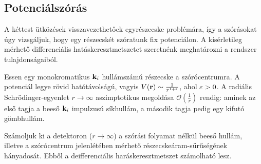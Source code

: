   \subsection{Potenciálszórás}
   
   A kéttest ütközések visszavezethetőek egyrészecske problémára, így a szórásokat úgy vizsgáljuk, hogy egy részecskét szóratunk fix potenciálon. A kísérletileg mérhető differenciális hatáskeresztmetszetet szeretnénk meghatározni a rendszer tulajdonságaiból.
   
   Essen egy monokromatikus $\mathbf{k}_i$ hullámszámú részecske a szórócentrumra. A potenciál legye rövid hatótávolságú, vagyis $V(\mathbf{r})\sim\frac{1}{r^{1+\varepsilon}}$, ahol $\varepsilon>0$. A radiális Schrödinger-egyenlet $r\to\infty$ aszimptotikus megoldása $\mathcal{O}\left(\frac{1}{r}\right)$ rendig:
   aminek az első tagja a beeső $\mathbf{k}_i$ impulzusú síkhullám, a második tagja pedig egy kifutó gömbhullám.
   
   Számoljuk ki a detektoron ($r\to\infty$) a szórási folyamat nélkül beeső hullám, illetve a szórócentrum jelenlétében mérhető részecskeáram-sűrűségének hányadosát. Ebből a deifferenciális haráskeresztmetszet számolható lesz.
   
